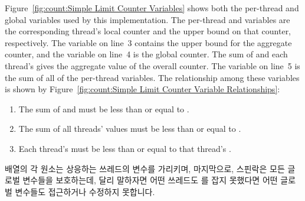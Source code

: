 Figure~\ref{fig:count:Simple Limit Counter Variables}
shows both the per-thread and global variables used by this
implementation.
The per-thread  and  variables are the
corresponding thread's local counter and the upper bound on that
counter, respectively.
The  variable on line~3 contains the upper
bound for the aggregate counter, and the  variable
on line~4 is the global counter.
The sum of  and each thread's  gives
the aggregate value of the overall counter.
The  variable on line~5 is the sum of all of the
per-thread  variables.
The relationship among these variables is shown by
Figure~\ref{fig:count:Simple Limit Counter Variable Relationships}:
\begin{enumerate}
\item	The sum of  and  must
	be less than or equal to .
\item	The sum of all threads'  values must be
	less than or equal to .
\item	Each thread's  must be less than or equal to
	that thread's .
\end{enumerate}
\fi

 배열의 각 원소는 상응하는 쓰레드의  변수를
가리키며, 마지막으로,  스핀락은 모든 글로벌 변수들을
보호하는데, 달리 말하자면 어떤 쓰레드도  를 잡지 못했다면 어떤
글로벌 변수들도 접근하거나 수정하지 못합니다.

